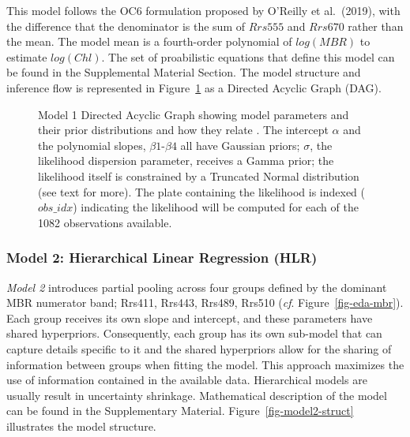 \documentclass[
]{agujournal2019}
\makeatletter
\newcommand*\pandocbounded[1]{%
  \sbox\pandoc@box{#1}%
  \Gscale@div\@tempa{\textheight}{\dimexpr\ht\pandoc@box+\dp\pandoc@box\relax}%
  \Gscale@div\@tempb{\linewidth}{\wd\pandoc@box}%
  \ifdim\@tempb\p@<\@tempa\p@\let\@tempa\@tempb\fi%
  \ifdim\@tempa\p@<\p@\scalebox{\@tempa}{\usebox\pandoc@box}%
  \else\usebox{\pandoc@box}%
  \fi%
}
\makeatother
\begin{document}
This model follows the OC6 formulation proposed by O'Reilly et
al.~(2019), with the difference that the denominator is the sum of
\(Rrs555\) and \(Rrs670\) rather than the mean. The model mean is a
fourth-order polynomial of \(log(MBR)\) to estimate \(log(Chl)\). The
set of proabilistic equations that define this model can be found in the
Supplemental Material Section. The model structure and inference flow is
represented in Figure~\ref{fig-model1-struct} as a Directed Acyclic
Graph (DAG).

\begin{figure}

\centering{

\pandocbounded{\texttt{[image: images/model1\_structure.png]}}

}

\caption{\label{fig-model1-struct}Model 1 Directed Acyclic Graph showing
model parameters and their prior distributions and how they relate . The
intercept \(α\) and the polynomial slopes, \(β1\)-\(β4\) all have
Gaussian priors; \(σ\), the likelihood dispersion parameter, receives a
Gamma prior; the likelihood itself is constrained by a Truncated Normal
distribution (see text for more). The plate containing the likelihood is
indexed (\(obs\_idx\)) indicating the likelihood will be computed for
each of the 1082 observations available.}

\end{figure}%

\subsubsection{Model 2: Hierarchical Linear Regression
(HLR)}\label{model-2-hierarchical-linear-regression-hlr}

\emph{Model 2} introduces partial pooling across four groups defined by
the dominant MBR numerator band; Rrs411, Rrs443, Rrs489, Rrs510
(\emph{cf}. Figure~\ref{fig-eda-mbr}). Each group receives its own slope
and intercept, and these parameters have shared hyperpriors.
Consequently, each group has its own sub-model that can capture details
specific to it and the shared hyperpriors allow for the sharing of
information between groups when fitting the model. This approach
maximizes the use of information contained in the available data.
Hierarchical models are usually result in uncertainty shrinkage.
Mathematical description of the model can be found in the Supplementary
Material. Figure~\ref{fig-model2-struct} illustrates the model
structure.
\end{document}
